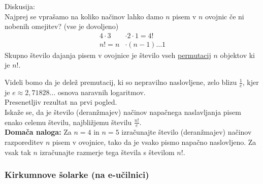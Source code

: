 \documentclass[12pt]{article}
\begin{document}
\noindent
Diskusija: \\
Najprej se vprašamo na koliko načinov lahko damo $n$ pisem v $n$ ovojnic če ni nobenih omejitev? (vse je dovoljeno)
\begin{align*}
    4 \cdot 3 &\cdot 2 \cdot 1 = 4! \\
    n! = n &\cdot (n - 1) \dots 1
\end{align*}
Skupno število dajanja pisem v ovojnice je število vseh \underline{permutacij} $n$ objektov ki je $n!$.
\begin{center}
\end{center}
Videli bomo da je delež premutacij, ki so nepravilno naslovljene, zelo blizu $\frac{1}{e}$, kjer je $e \approx 2,71828\dots$ osnova naravnih logaritmov. \\

\noindent
Presenetljiv rezultat na prvi pogled. \\

\noindent
Iskaže se, da je število (deranžmajev) načinov napačnega naslavljanja pisem enako celemu številu, najbližjemu številu $\frac{n!}{e}$. \\

\noindent
\textbf{Domača naloga:} Za $n = 4$ in $n = 5$ izračunajte število (deranžmajev) načinov razporeditev $n$ pisem v ovojnice, tako da je vsako pismo napačno naslovljeno. Za vsak tak $n$ izračunajte razmerje tega števila s številom $n!$.

\subsubsection{Kirkumnove šolarke (na e-učilnici)}
\end{document}
